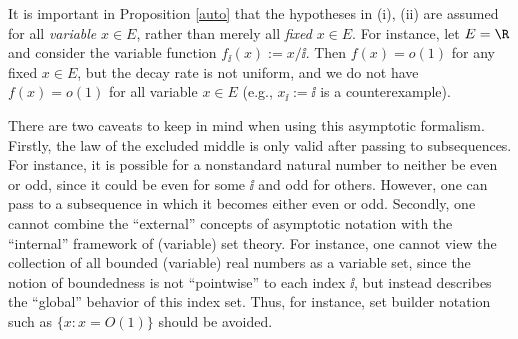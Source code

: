 \begin{remark} It is important in Proposition \ref{auto} that the hypotheses in (i), (ii) are assumed for all \emph{variable} $x \in E$, rather than merely all \emph{fixed} $x \in E$.  For instance, let $E = \R$ and consider the variable function $f_{\ii}(x) := x/\ii$.  Then $f(x) = o(1)$ for any fixed $x \in E$, but the decay rate is not uniform, and we do not have $f(x) = o(1)$ for all variable $x \in E$ (e.g., $x_\ii := \ii$ is a counterexample).
\end{remark}


\begin{remark} There are two caveats to keep in mind when using this asymptotic formalism.  Firstly, the law of the excluded middle is only valid after passing to subsequences.  For instance, it is possible for a nonstandard natural number to neither be even or odd, since it could be even for some $\ii$ and odd for others.  However, one can pass to a subsequence in which it becomes either even or odd.  Secondly, one cannot combine the ``external'' concepts of asymptotic notation with the ``internal'' framework of (variable) set theory.  For instance, one cannot view the collection of all bounded (variable) real numbers as a variable set, since the notion of boundedness is not ``pointwise'' to each index $\ii$, but instead describes the ``global'' behavior of this index set.  Thus, for instance, set builder notation such as $\{ x: x = O(1) \}$ should be avoided.
\end{remark}




